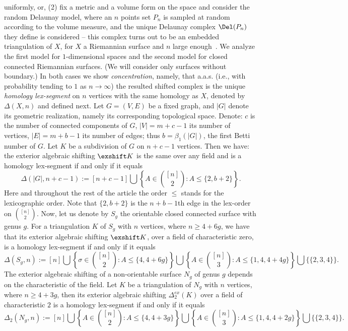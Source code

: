uniformly, or, 
(2)
fix a metric and a volume form on the space
and consider the random Delaunay model, where an $n$ points set $P_n$ is sampled at random according to the volume measure, and the unique Delaunay complex $\Del(P_n)$ they define is considered -- this complex turns out to be an embedded triangulation of $X$, for $X$ a Riemannian surface and $n$ large enough~\cite{leibon99-delaunay,dyer08-surface}. 
%
%
We analyze the first model for $1$-dimensional spaces and the second model for closed connected Riemannian surfaces. (We will consider only surfaces without boundary.) 
In both cases we show \textit{concentration}, namely, that a.a.s. (i.e., with probability tending to $1$ as $n\to\infty$) the resulted shifted complex is the unique \emph{homology lex-segment} on $n$ vertices with the same homology as $X$, denoted by $\Delta(X,n)$ and defined next. 
%
Let $G=(V,E)$ be a fixed graph, and $|G|$ denote its geometric realization, namely its corresponding topological space. Denote: $c$ is the number of connected components of $G$, $|V|=m+c-1$ its number of vertices, $|E|=m+b-1$ its number of edges; thus $b=\beta_1(|G|)$, the first Betti number of $G$.
Let $K$ be a subdivision of $G$ on $n+c-1$ vertices. Then we have: the exterior algebraic shifting $\exshift K$ is the same over any field and 
is a homology lex-segment if and only if it equals 
$$\Delta(|G|,n+c-1) := [n+c-1] \bigcup \left \{A \in \binom{[n]}{2}\colon A \leq \{2,b+2\} \right \}.$$
Here and throughout the rest of the article the order $\leq$ stands for the lexicographic order.
Note that $\{2,b+2\}$ is the $n+b-1$th edge in the lex-order on $\binom{[n]}{2}$.
%
Now, let us denote by $S_g$ the orientable closed connected surface with genus $g$. For a triangulation $K$ of $S_g$ with $n$ vertices, where $n\ge 4+6g$, we have that its exterior algebraic shifting
$\exshift K$, over a field of characteristic zero,
is a homology lex-segment if and only if it equals 
$$\Delta(S_g, n):= [n] \bigcup \left \{\sigma\in \binom{[n]}{2}\colon A \leq \{4,4+6g\} \right \} \bigcup \left \{ A \in \binom{[n]}{3} \colon A \leq \{1,4,4+4g\} \right \} \bigcup \{\{2,3,4\}\}.$$
%
The exterior algebraic shifting of a non-orientable surface $N_g$ of genus $g$ depends on the characteristic of the field.
Let $K$ be a triangulation of $N_g$ with $n$ vertices, where $n\geq 4+3g$, then its exterior algebraic shifting $\Delta^{ex}_2(K)$ over a field of characteristic $2$ is a homology lex-segment if and only if it equals
$$\Delta_2(N_g, n):= [n] \bigcup \left \{A \in \binom{[n]}{2}\colon A \leq \{4,4+3g\} \right \} \bigcup \left \{ A \in \binom{[n]}{3} \colon A \leq \{1,4,4+2g\} \right \} \bigcup \{\{2,3,4\}\}.$$
